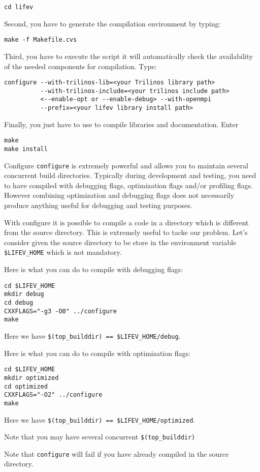 \begin{verbatim}
cd lifev
\end{verbatim}

\noindent Second, you have to generate the compilation environment by typing:
\begin{verbatim}
make -f Makefile.cvs
\end{verbatim}

\noindent Third, you have to execute the script
it will automatically check the availability of the needed components
for \lifev compilation. Type:

\begin{verbatim}
configure --with-trilinos-lib=<your Trilinos library path>
          --with-trilinos-include=<your trilinos include path>
          <--enable-opt or --enable-debug> --with-openmpi
          --prefix=<your lifev library install path>
\end{verbatim}

\noindent Finally, you just have to use  to compile \lifev libraries and documentation.
Enter
\begin{verbatim}
make
make install
\end{verbatim}

\begin{hint}{Configure}
  \label{hint:configure}
  \verb!configure! is extremely powerful and allows you to maintain
  several concurrent build directories. Typically during development
  and testing, you need to have \lifev compiled with debugging flags,
  optimization flags and/or profiling flags. However combining
  optimization and debugging flags does not necessarily produce
  anything useful for debugging and testing purposes.

  With configure it is possible to compile a code in a directory which
  is different from the source directory. This is extremely useful to
  tacke our problem. Let's consider given the source directory to be
  store in the environment variable \verb!$LIFEV_HOME! which is not
  mandatory.

Here is what you can do to compile with debugging flags:
\begin{verbatim}
cd $LIFEV_HOME
mkdir debug
cd debug
CXXFLAGS="-g3 -O0" ../configure
make
\end{verbatim}
Here we have \verb+$(top_builddir) == $LIFEV_HOME/debug+.

Here is what you can do to compile with optimization flags:
\begin{verbatim}
cd $LIFEV_HOME
mkdir optimized
cd optimized
CXXFLAGS="-O2" ../configure
make
\end{verbatim}
Here we have \verb+$(top_builddir) == $LIFEV_HOME/optimized+.

\noindent Note that you may have several concurrent \verb+$(top_builddir)+

\noindent Note that \verb!configure! will fail if you have already compiled
\lifev in the source directory.


\end{hint}


